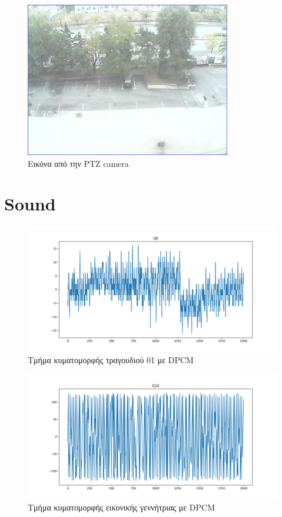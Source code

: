 \documentclass{article}
\begin{document}
\begin{figure}[H]
  \begin{center}
    \includegraphics[width=0.8\textwidth]{../../results/session2/E2.jpg}
  \end{center}
  \caption{Εικόνα από την PTZ camera}
\end{figure}

\section{Sound}

\begin{figure}[H]
  \begin{center}
    \includegraphics[width=\textwidth]{G9.png}
  \end{center}
  \caption{Τμήμα κυματομορφής τραγουδιού 01 με DPCM}
\end{figure}

\begin{figure}[H]
  \begin{center}
    \includegraphics[width=\textwidth]{G10.png}
  \end{center}
  \caption{Τμήμα κυματομορφής εικονικής γεννήτριας με DPCM}
\end{figure}
\end{document}
